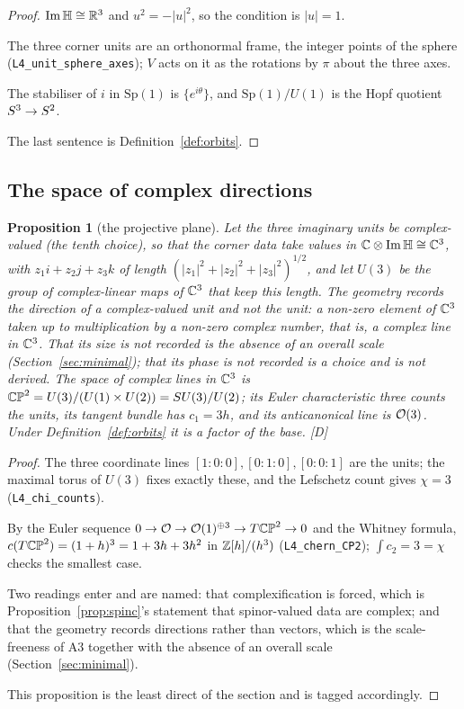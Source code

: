 \documentclass[11pt,a4paper]{article}
\theoremstyle{plain}
\newtheorem{proposition}[theorem]{Proposition}
\theoremstyle{definition}
\theoremstyle{remark}
\newcommand{\Hquat}{\mathbb{H}}
\newcommand{\ImH}{\operatorname{Im}\Hquat}
\newcommand{\rigD}{[\textup{D}]}
\begin{document}
\begin{proof}
$\ImH\cong\R^{3}$ and $u^{2}=-\lvert u\rvert^{2}$, so the condition is $\lvert u\rvert=1$.

The three corner units are an orthonormal frame, the integer points of the sphere (\texttt{L4\_unit\_sphere\_axes}); $V$ acts on it as the rotations by $\pi$ about the three axes.

The stabiliser of $i$ in $\mathrm{Sp}(1)$ is $\{e^{i\theta}\}$, and $\mathrm{Sp}(1)/U(1)$ is the Hopf quotient $S^{3}\to S^2$.

The last sentence is Definition~\ref{def:orbits}.
\end{proof}

\subsection{The space of complex directions}

\begin{proposition}[the projective plane]\label{prop:CP2}
Let the three imaginary units be complex-valued (the tenth choice), so that the corner data take values in $\C\otimes\ImH\cong\C^{3}$, with $z_{1}i+z_{2}j+z_{3}k$ of length $(\lvert z_{1}\rvert^{2}+\lvert z_{2}\rvert^{2}+\lvert z_{3}\rvert^{2})^{1/2}$, and let $U(3)$ be the group of complex-linear maps of $\mathbb{C}^{3}$ that keep this length. The geometry records the direction of a complex-valued unit and not the unit: a non-zero element of $\mathbb{C}^{3}$ taken up to multiplication by a non-zero complex number, that is, a complex line in $\mathbb{C}^{3}$. That its size is not recorded is the absence of an overall scale (Section~\ref{sec:minimal}); that its phase is not recorded is a choice and is not derived. The space of complex lines in $\mathbb{C}^{3}$ is $\mathbb{CP}^2=U(3)/(U(1)\times U(2))=SU(3)/U(2)$; its Euler characteristic three counts the units, its tangent bundle has $c_{1}=3h$, and its anticanonical line is $\mathcal{O}(3)$. Under Definition~\ref{def:orbits} it is a factor of the base. \rigD
\end{proposition}

\begin{proof}
The three coordinate lines $[1{:}0{:}0],[0{:}1{:}0],[0{:}0{:}1]$ are the units; the maximal torus of $U(3)$ fixes exactly these, and the Lefschetz count gives $\chi=3$ (\texttt{L4\_chi\_counts}).

By the Euler sequence $0\to\mathcal{O}\to\mathcal{O}(1)^{\oplus3}\to T\mathbb{CP}^2\to0$ and the Whitney formula, $c(T\mathbb{CP}^2)=(1+h)^{3}=1+3h+3h^{2}$ in $\mathbb{Z}[h]/(h^{3})$ \cite{GriffithsHarris} (\texttt{L4\_chern\_CP2}); $\int c_{2}=3=\chi$ checks the smallest case.

Two readings enter and are named: that complexification is forced, which is Proposition~\ref{prop:spinc}'s statement that spinor-valued data are complex; and that the geometry records directions rather than vectors, which is the scale-freeness of A3 together with the absence of an overall scale (Section~\ref{sec:minimal}).

This proposition is the least direct of the section and is tagged accordingly.
\end{proof}
\end{document}
